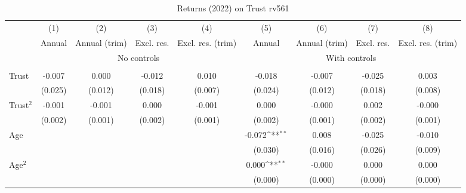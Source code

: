 \begin{table}[htbp]\centering
\def\sym#1{\ifmmode^{#1}\else\(^{#1}\)\fi}
\caption{Returns (2022) on Trust rv561}
\begin{tabular}{l*{8}{c}}
\toprule
          &\multicolumn{1}{c}{(1)}&\multicolumn{1}{c}{(2)}&\multicolumn{1}{c}{(3)}&\multicolumn{1}{c}{(4)}&\multicolumn{1}{c}{(5)}&\multicolumn{1}{c}{(6)}&\multicolumn{1}{c}{(7)}&\multicolumn{1}{c}{(8)}\\
          &\multicolumn{1}{c}{Annual}&\multicolumn{1}{c}{Annual (trim)}&\multicolumn{1}{c}{Excl. res.}&\multicolumn{1}{c}{Excl. res. (trim)}&\multicolumn{1}{c}{Annual}&\multicolumn{1}{c}{Annual (trim)}&\multicolumn{1}{c}{Excl. res.}&\multicolumn{1}{c}{Excl. res. (trim)}\\
& \multicolumn{4}{c}{No controls} & \multicolumn{4}{c}{With controls} \\\\ \cmidrule(lr){2-5}\cmidrule(lr){6-9}
Trust     &   -0.007         &    0.000         &   -0.012         &    0.010         &   -0.018         &   -0.007         &   -0.025         &    0.003         \\
          &  (0.025)         &  (0.012)         &  (0.018)         &  (0.007)         &  (0.024)         &  (0.012)         &  (0.018)         &  (0.008)         \\
Trust$^{2}$&   -0.001         &   -0.001         &    0.000         &   -0.001         &    0.000         &   -0.000         &    0.002         &   -0.000         \\
          &  (0.002)         &  (0.001)         &  (0.002)         &  (0.001)         &  (0.002)         &  (0.001)         &  (0.002)         &  (0.001)         \\
Age       &                  &                  &                  &                  &   -0.072\sym{**} &    0.008         &   -0.025         &   -0.010         \\
          &                  &                  &                  &                  &  (0.030)         &  (0.016)         &  (0.026)         &  (0.009)         \\
Age$^{2}$ &                  &                  &                  &                  &    0.000\sym{**} &   -0.000         &    0.000         &    0.000         \\
          &                  &                  &                  &                  &  (0.000)         &  (0.000)         &  (0.000)         &  (0.000)         \\

\end{tabular}
\end{table}
